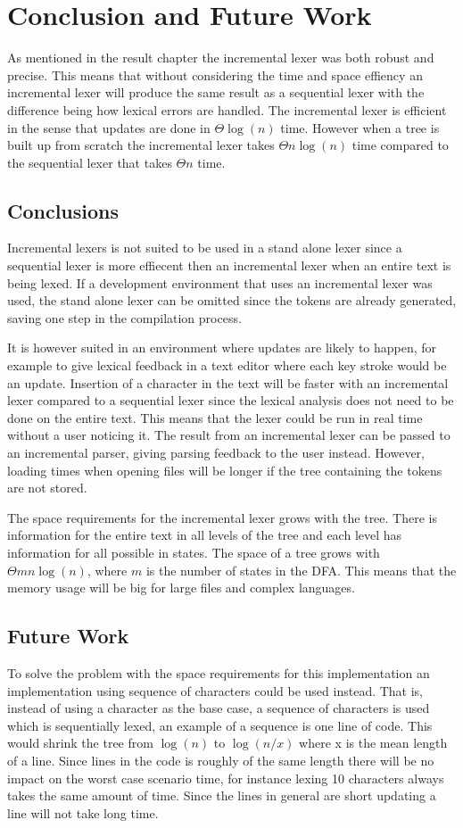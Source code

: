 \chapter{Conclusion and Future Work}
As mentioned in the result chapter the incremental lexer was both robust and
precise. This means that without considering the time and space effiency an
incremental lexer will produce the same result as a sequential lexer with the
difference being how lexical errors are handled. The incremental lexer is
efficient in the sense that updates are done in $\Theta \log(n)$ time. However
when a tree is built up from scratch the incremental lexer takes
$\Theta n\log(n)$ time compared to the sequential lexer that takes $\Theta n$
time.

\section{Conclusions}
Incremental lexers is not suited to be used in a stand alone lexer since a
sequential lexer is more effiecent then an incremental lexer when an entire text
is being lexed. If a development environment that uses an incremental lexer was
used, the stand alone lexer can be omitted since the tokens are already
generated, saving one step in the compilation process.

It is however suited in an environment where updates are likely to happen, for
example to give lexical feedback in a text editor where each key stroke would be
an update. Insertion of a character in the text will be faster with an
incremental lexer compared to a sequential lexer since the lexical analysis does
not need to be done on the entire text. This means that the lexer could be run
in real time without a user noticing it. The result from an incremental lexer
can be passed to an incremental parser, giving parsing feedback to the user
instead. However, loading times when opening files will be longer if the tree
containing the tokens are not stored.

The space requirements for the incremental lexer grows with the tree. There is
information for the entire text in all levels of the tree and each level has
information for all possible in states. The space of a tree grows with
$\Theta mn\log(n)$, where $m$ is the number of states in the DFA. This means
that the memory usage will be big for large files and complex languages.

\section{Future Work}
To solve the problem with the space requirements for this implementation an
implementation using sequence of characters could be used instead. That is,
instead of using a character as the base case, a sequence of characters is used
which is sequentially lexed, an example of a sequence is one line of code. This
would shrink the tree from $\log(n)$ to $\log(n/x)$ where x is the mean length
of a line. Since lines in the code is roughly of the same length there will be
no impact on the worst case scenario time, for instance lexing 10 characters
always takes the same amount of time. Since the lines in general are short
updating a line will not take long time.

